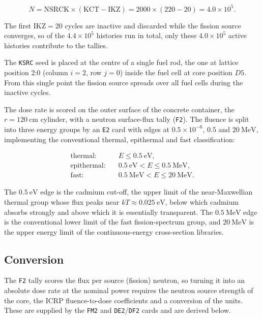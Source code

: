 \begin{equation}
N = \mathrm{NSRCK}\times(\mathrm{KCT}-\mathrm{IKZ}) = 2000\times(220-20) = 4.0\times10^{5}.
\end{equation}

The first $\mathrm{IKZ}=20$ cycles are inactive and discarded while the fission source converges, so of the $4.4\times10^{5}$ histories run in total, only these $4.0\times10^{5}$ active histories contribute to the tallies.

The \texttt{KSRC} seed is placed at the centre of a single fuel rod, the one at lattice position $2$:$0$ (column $i=2$, row $j=0$) inside the fuel cell at core position $D5$.
From this single point the fission source spreads over all fuel cells during the inactive cycles.

The dose rate is scored on the outer surface of the concrete container, the $r=120~\mathrm{cm}$ cylinder, with a neutron surface-flux tally (\texttt{F2}).
The fluence is split into three energy groups by an \texttt{E2} card with edges at $0.5\times10^{-6}$, $0.5$ and $20~\mathrm{MeV}$, implementing the conventional thermal, epithermal and fast classification:

\begin{equation}
  \begin{aligned}
    \text{thermal:}    &\quad E \le 0.5~\mathrm{eV},\\
    \text{epithermal:} &\quad 0.5~\mathrm{eV} < E \le 0.5~\mathrm{MeV},\\
    \text{fast:}       &\quad 0.5~\mathrm{MeV} < E \le 20~\mathrm{MeV}.
  \end{aligned}
\end{equation}

The $0.5~\mathrm{eV}$ edge is the cadmium cut-off, the upper limit of the near-Maxwellian thermal group whose flux peaks near $kT\approx0.025~\mathrm{eV}$, below which cadmium absorbs strongly and above which it is essentially transparent.
The $0.5~\mathrm{MeV}$ edge is the conventional lower limit of the fast fission-spectrum group, and $20~\mathrm{MeV}$ is the upper energy limit of the continuous-energy cross-section libraries.

\newpage

\subsection{Conversion}\label{sec:conversion}

The \texttt{F2} tally scores the flux per source (fission) neutron, so turning it into an absolute dose rate at the nominal power requires the neutron source strength of the core, the ICRP fluence-to-dose coefficients \cite{icrp} and a conversion of the units.
These are supplied by the \texttt{FM2} and \texttt{DE2}/\texttt{DF2} cards and are derived below.

